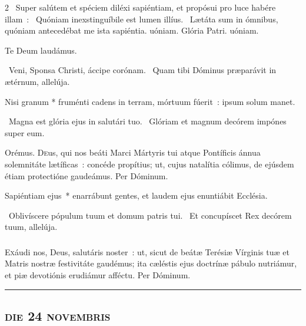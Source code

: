 \documentclass[9pt,twoside]{extarticle}
\begin{document}
\begin{multicols}{2}
~Super salútem et spéciem diléxi sapiéntiam, et propósui pro luce habére illam~: \textred{*}~Quóniam inexstinguíbile est lumen illíus. ~Lætáta sum in ómnibus, quóniam antecedébat me ista sapiéntia. uóniam. Glória Patri. uóniam.

Te Deum laudámus. %

~Veni, Sponsa Christi, áccipe corónam. ~Quam tibi Dóminus præparávit in ætérnum, allelúja.

{\small {}}

 Nisi granum * fruménti cadens in terram, mórtuum fúerit~: ipsum solum manet.

~Magna est glória ejus in salutári tuo. ~Glóriam et magnum decórem impónes super eum.
 
\smallskip
Orémus. \hfill {}
\lettrine{D}eus, qui nos beáti Marci Mártyris tui atque Pontíficis ánnua solemnitáte lætíficas~: concéde propítius; ut, cujus natalítia cólimus, de ejúsdem étiam protectióne gaudeámus. Per Dóminum.

\small {}

\normalsize
{} Sapiéntiam ejus~* enarrábunt gentes, et laudem ejus enuntiábit Ecclésia.

~Oblivíscere pópulum tuum et domum patris tui. ~Et concupíscet Rex decórem tuum, allelúja.

\subsubsection*{\center \normalfont {}}
\lettrine{E}{x}áudi nos, Deus, salutáris noster~: ut, sicut de beátæ Terésiæ Vírginis tuæ et Matris nostræ festivitáte gaudémus; ita cæléstis ejus doctrínæ pábulo nutriámur, et piæ devotiónis erudiámur afféctu. Per Dóminum.

\begin{center}\textcolor{red}{\rule{\linewidth}{0.5pt}} \end{center}

\subsection*{\center \normalfont \textsc{die 24 novembris}}

\end{multicols}
\end{document}
